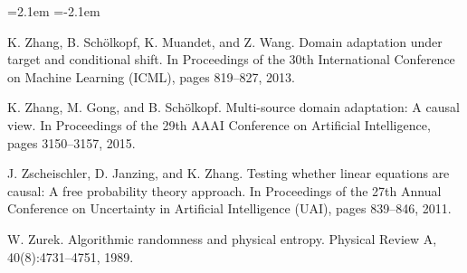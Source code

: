 \begin{list}{}{\leftmargin=2.1em
 \itemindent=-2.1em\parsep=0pt\itemsep=3pt}
\item K. Zhang, B. Schölkopf, K. Muandet, and Z. Wang. Domain adaptation under target and conditional shift. In Proceedings of the 30th International Conference on Machine Learning (ICML), pages 819--827, 2013.
\item K. Zhang, M. Gong, and B. Schölkopf. Multi-source domain adaptation: A causal view. In Proceedings of the 29th AAAI Conference on Artificial Intelligence, pages 3150--3157, 2015.
\item J. Zscheischler, D. Janzing, and K. Zhang. Testing whether linear equations are causal: A free probability theory approach. In Proceedings of the 27th Annual Conference on Uncertainty in Artificial Intelligence (UAI), pages 839--846, 2011.
\item W. Zurek. Algorithmic randomness and physical entropy. Physical Review A, 40(8):4731--4751, 1989.
\end{list}
\endgroup
